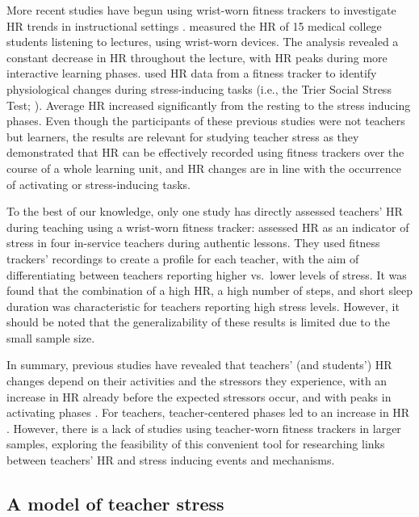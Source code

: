 \documentclass[preprint, 3p,
authoryear]{elsarticle} %
\begin{document}
More recent studies have begun using wrist-worn fitness trackers to
investigate HR trends in instructional settings
\citep{Darnell2019, chalmers2021}. \citet{Darnell2019} measured the HR
of 15 medical college students listening to lectures, using wrist-worn
devices. The analysis revealed a constant decrease in HR throughout the
lecture, with HR peaks during more interactive learning phases.
\citet{chalmers2021} used HR data from a fitness tracker to identify
physiological changes during stress-inducing tasks (i.e., the Trier
Social Stress Test; \citet{kirschbaum1993trier}). Average HR increased
significantly from the resting to the stress inducing phases. Even
though the participants of these previous studies
\citep{Darnell2019, chalmers2021} were not teachers but learners, the
results are relevant for studying teacher stress as they demonstrated
that HR can be effectively recorded using fitness trackers over the
course of a whole learning unit, and HR changes are in line with the
occurrence of activating or stress-inducing tasks.

To the best of our knowledge, only one study has directly assessed
teachers' HR during teaching using a wrist-worn fitness tracker:
\citet{runge2020} assessed HR as an indicator of stress in four
in-service teachers during authentic lessons. They used fitness
trackers' recordings to create a profile for each teacher, with the aim
of differentiating between teachers reporting higher vs.~lower levels of
stress. It was found that the combination of a high HR, a high number of
steps, and short sleep duration was characteristic for teachers
reporting high stress levels. However, it should be noted that the
generalizability of these results is limited due to the small sample
size.

In summary, previous studies have revealed that teachers' (and
students') HR changes depend on their activities and the stressors they
experience, with an increase in HR already before the expected stressors
occur, and with peaks in activating phases
\citep{Darnell2019, chalmers2021}. For teachers, teacher-centered phases
led to an increase in HR
\citep{sperka1995, scheuch1997psychophysische, donker2018, junker2021}.
However, there is a lack of studies using teacher-worn fitness trackers
in larger samples, exploring the feasibility of this convenient tool for
researching links between teachers' HR and stress inducing events and
mechanisms.

\subsection{A model of teacher stress}\label{a-model-of-teacher-stress}
\end{document}
